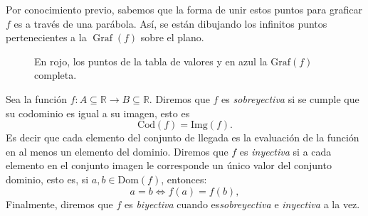 Por conocimiento previo, sabemos que la forma de unir estos puntos para graficar $f$ es a través de una parábola. Así, se están dibujando los infinitos puntos pertenecientes a la $\operatorname{Graf}(f)$ sobre el plano.
 \begin{figure}[H] 
            \begin{center}
                \end{center}
            \caption{En rojo, los puntos de la tabla de valores y en azul la $\text{Graf}(f)$ completa.}
        \end{figure}

\begin{definition}  Sea la funci\'on $f: A \subseteq \mathbb{R} \rightarrow B \subseteq \mathbb{R}$. Diremos que
   $f$ es \textit{sobreyectiva} si se cumple que su codominio es igual a su imagen, esto es
   \begin{equation*}
        \text{Cod}(f)=\text{Img}(f).
    \end{equation*}   Es decir que cada elemento del conjunto de llegada es la evaluación de la función en al menos un elemento del dominio.
 Diremos que $f$ es   \textit{inyectiva} si a cada elemento en el conjunto imagen le corresponde un único
    valor del  conjunto dominio, esto es,   si  $a,b\in \text{Dom}(f)$, entonces:
     \begin{equation*}
        a=b \iff f(a)=f(b),
    \end{equation*} 
 Finalmente, diremos que $f$  es \textit{biyectiva} cuando es\textit{sobreyectiva} e \textit{inyectiva} a la vez.
\end{definition}



